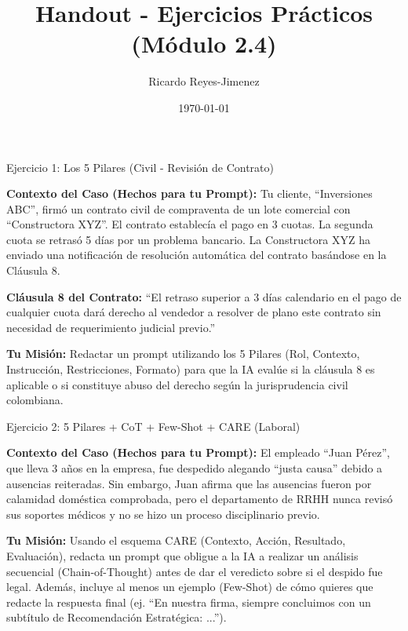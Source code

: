 \documentclass[aspectratio=169]{beamer}
\title[Handout - Ejercicios Prácticos]{Handout - Ejercicios Prácticos (Módulo 2.4)}
\subtitle{}
\author{Ricardo Reyes-Jimenez}
\institute{Universidad de La Sabana}
\date{\today}
\begin{document}
\begin{frame}
  \titlepage
\end{frame}

\usebackgroundtemplate{}



\begin{frame}[fragile]{Ejercicio 1: Los 5 Pilares (Civil - Revisión de Contrato)}


\textbf{Contexto del Caso (Hechos para tu Prompt):}
Tu cliente, ``Inversiones ABC'', firmó un contrato civil de compraventa de un lote comercial con ``Constructora XYZ''. El contrato establecía el pago en 3 cuotas. La segunda cuota se retrasó 5 días por un problema bancario. La Constructora XYZ ha enviado una notificación de resolución automática del contrato basándose en la Cláusula 8.

\textbf{Cláusula 8 del Contrato:} ``El retraso superior a 3 días calendario en el pago de cualquier cuota dará derecho al vendedor a resolver de plano este contrato sin necesidad de requerimiento judicial previo.''

\textbf{Tu Misión:}
Redactar un prompt utilizando los 5 Pilares (Rol, Contexto, Instrucción, Restricciones, Formato) para que la IA evalúe si la cláusula 8 es aplicable o si constituye abuso del derecho según la jurisprudencia civil colombiana.

\end{frame}



\begin{frame}[fragile]{Ejercicio 2: 5 Pilares + CoT + Few-Shot + CARE (Laboral)}


\textbf{Contexto del Caso (Hechos para tu Prompt):}
El empleado ``Juan Pérez'', que lleva 3 años en la empresa, fue despedido alegando ``justa causa'' debido a ausencias reiteradas. Sin embargo, Juan afirma que las ausencias fueron por calamidad doméstica comprobada, pero el departamento de RRHH nunca revisó sus soportes médicos y no se hizo un proceso disciplinario previo.

\textbf{Tu Misión:}
Usando el esquema CARE (Contexto, Acción, Resultado, Evaluación), redacta un prompt que obligue a la IA a realizar un análisis secuencial (Chain-of-Thought) antes de dar el veredicto sobre si el despido fue legal. Además, incluye al menos un ejemplo (Few-Shot) de cómo quieres que redacte la respuesta final (ej. ``En nuestra firma, siempre concluimos con un subtítulo de Recomendación Estratégica: ...'').

\end{frame}
\end{document}
